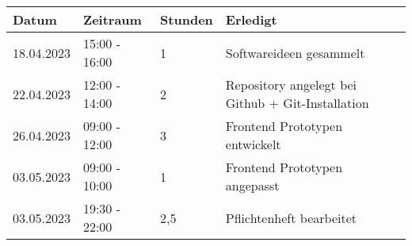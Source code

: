 \begin{tabular}{|l|l|l|l|}
\hline
Datum & Zeitraum & Stunden & Erledigt \\
\hline
    18.04.2023 & 15:00 - 16:00 & 1 & Softwareideen gesammelt\\
    22.04.2023 & 12:00 - 14:00 & 2 & Repository angelegt bei Github + Git-Installation\\
    26.04.2023 & 09:00 - 12:00 & 3 & Frontend Prototypen entwickelt\\
    03.05.2023 & 09:00 - 10:00 & 1 & Frontend Prototypen angepasst\\
    03.05.2023 & 19:30 - 22:00 & 2,5 & Pflichtenheft bearbeitet\\
\hline
\end{tabular}